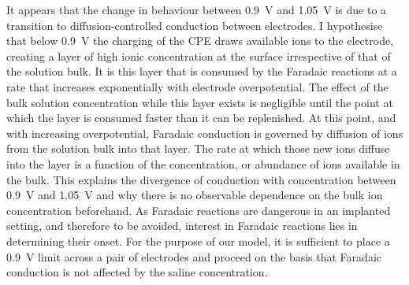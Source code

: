         It appears that the change in behaviour between \SI{0.9}{\volt} and \SI{1.05}{\volt} is due to a transition to diffusion-controlled conduction between electrodes.
        I hypothesise that below \SI{0.9}{\volt} the charging of the CPE draws available ions to the electrode, creating a layer of high ionic concentration at the surface irrespective of that of the solution bulk.
        It is this layer that is consumed by the Faradaic reactions at a rate that increases exponentially with electrode overpotential.
        The effect of the bulk solution concentration while this layer exists is negligible until the point at which the layer is consumed faster than it can be replenished.
        At this point, and with increasing overpotential, Faradaic conduction is governed by diffusion of ions from the solution bulk into that layer.
        The rate at which those new ions diffuse into the layer is a function of the concentration, or abundance of ions available in the bulk.
        This explains the divergence of conduction with concentration between \SI{0.9}{\volt} and \SI{1.05}{\volt} and why there is no observable dependence on the bulk ion concentration beforehand.
        As Faradaic reactions are dangerous in an implanted setting, and therefore to be avoided, interest in Faradaic reactions lies in determining their onset.
        For the purpose of our model, it is sufficient to place a \SI{0.9}{\volt} limit across a pair of electrodes and proceed on the basis that Faradaic conduction is not affected by the saline concentration.


